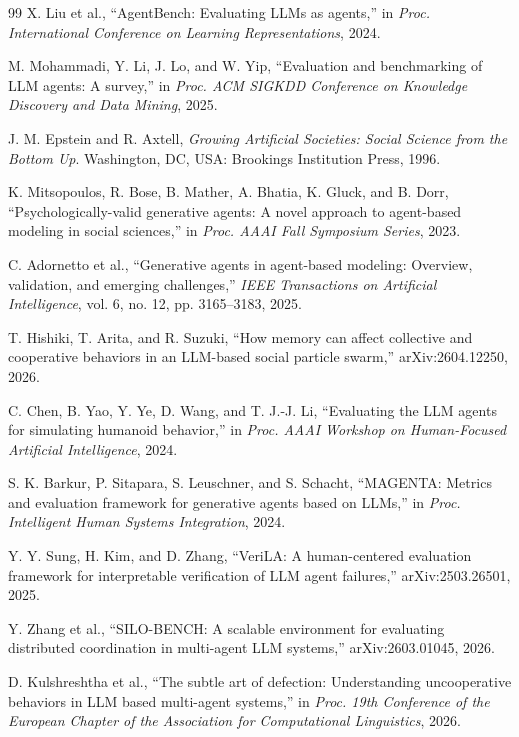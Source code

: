 \documentclass[11pt]{article}
\begin{document}
\begin{thebibliography}{99}
X. Liu et al., ``AgentBench: Evaluating LLMs as agents,'' in \emph{Proc. International Conference on Learning Representations}, 2024.

M. Mohammadi, Y. Li, J. Lo, and W. Yip, ``Evaluation and benchmarking of LLM agents: A survey,'' in \emph{Proc. ACM SIGKDD Conference on Knowledge Discovery and Data Mining}, 2025.

J. M. Epstein and R. Axtell, \emph{Growing Artificial Societies: Social Science from the Bottom Up}. Washington, DC, USA: Brookings Institution Press, 1996.

K. Mitsopoulos, R. Bose, B. Mather, A. Bhatia, K. Gluck, and B. Dorr, ``Psychologically-valid generative agents: A novel approach to agent-based modeling in social sciences,'' in \emph{Proc. AAAI Fall Symposium Series}, 2023.

C. Adornetto et al., ``Generative agents in agent-based modeling: Overview, validation, and emerging challenges,'' \emph{IEEE Transactions on Artificial Intelligence}, vol. 6, no. 12, pp. 3165--3183, 2025.

T. Hishiki, T. Arita, and R. Suzuki, ``How memory can affect collective and cooperative behaviors in an LLM-based social particle swarm,'' arXiv:2604.12250, 2026.

C. Chen, B. Yao, Y. Ye, D. Wang, and T. J.-J. Li, ``Evaluating the LLM agents for simulating humanoid behavior,'' in \emph{Proc. AAAI Workshop on Human-Focused Artificial Intelligence}, 2024.

S. K. Barkur, P. Sitapara, S. Leuschner, and S. Schacht, ``MAGENTA: Metrics and evaluation framework for generative agents based on LLMs,'' in \emph{Proc. Intelligent Human Systems Integration}, 2024.

Y. Y. Sung, H. Kim, and D. Zhang, ``VeriLA: A human-centered evaluation framework for interpretable verification of LLM agent failures,'' arXiv:2503.26501, 2025.

Y. Zhang et al., ``SILO-BENCH: A scalable environment for evaluating distributed coordination in multi-agent LLM systems,'' arXiv:2603.01045, 2026.

D. Kulshreshtha et al., ``The subtle art of defection: Understanding uncooperative behaviors in LLM based multi-agent systems,'' in \emph{Proc. 19th Conference of the European Chapter of the Association for Computational Linguistics}, 2026.


\end{thebibliography}
\end{document}
